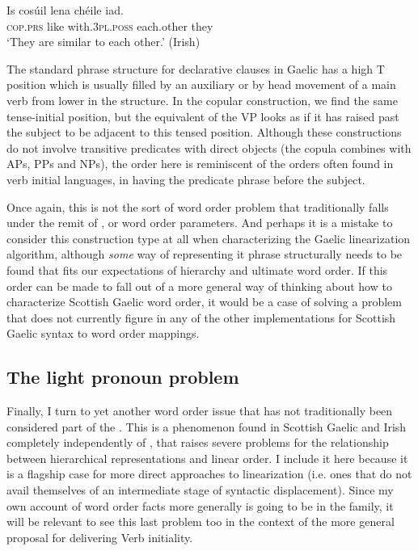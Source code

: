 \documentclass[output=paper,colorlinks,citecolor=brown]{langscibook}
\begin{document}
\ea\label{ex:r38}
\gll Is cos\'{u}il lena ch\'{e}ile  iad.\\
\textsc{cop.}\textsc{prs} like with.\textsc{3pl.poss} each.other they \\
\glt `They are similar to each other.' (Irish)
\z

The standard phrase structure for declarative clauses in Gaelic has a high T position which is usually filled by an auxiliary or by head movement of a main verb from lower in the structure. In the copular construction, we find the same tense-initial position, but the equivalent of the VP looks as if it has raised past the subject to be adjacent to this tensed position. Although these constructions do not involve transitive predicates with direct objects (the copula combines with APs, PPs and NPs), the order here is reminiscent of the  orders often found in verb initial languages, in having the predicate phrase before the subject. 

Once again, this is not the sort of word order problem that traditionally falls under the remit of , or word order parameters. And perhaps it is a mistake to consider this construction type at all when characterizing the Gaelic linearization algorithm, although \textit{some} way of representing it phrase structurally needs to be found that fits our expectations of hierarchy and ultimate word order.  If this order can be made to fall out of a more general way of thinking about how to characterize Scottish Gaelic word order,  it would be a case of solving a problem that does not currently figure in any of the other implementations for Scottish Gaelic syntax to word order mappings.  

\subsection{The light pronoun problem}

Finally, I turn to yet another word order issue that has not traditionally been considered part of the . This is a phenomenon found in Scottish Gaelic and Irish completely independently of , that raises severe problems for the relationship between hierarchical representations and linear order. I include it here because it is a flagship case for more direct approaches to linearization (i.e. ones that do not avail themselves of an intermediate stage of syntactic displacement).  Since my own account of word order facts more generally is going to be in the  family, it will be relevant to see this last problem too in the context of the more general proposal for delivering Verb initiality. 
\end{document}
